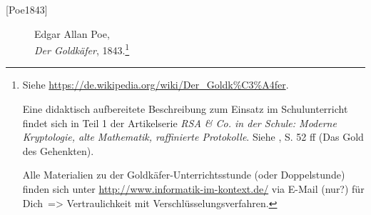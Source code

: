 \begin{description}

\item[\textrm{[Poe1843]}] 
    Edgar Allan Poe, \\
    {\em Der Goldkäfer}, 1843.\footnote{%
        Siehe \url{https://de.wikipedia.org/wiki/Der_Goldk%C3%A4fer}.

	Eine didaktisch aufbereitete Beschreibung zum Einsatz im Schulunterricht findet
        sich in Teil 1 der Artikelserie {\em RSA \& Co. in der Schule:
        Moderne Kryptologie, alte Mathematik, raffinierte Protokolle}.
        Siehe \cite{Witten1998}, S. 52 ff (\glqq Das Gold des Gehenkten\grqq).

	Alle Materialien zu der Goldkäfer-Unterrichtsstunde (oder Doppelstunde)
	finden sich unter \url{http://www.informatik-im-kontext.de/} via
	\glqq E-Mail (nur?) für Dich\grqq~=> \glqq Vertraulichkeit mit Verschlüsselungsverfahren\grqq.

}
\end{description}
